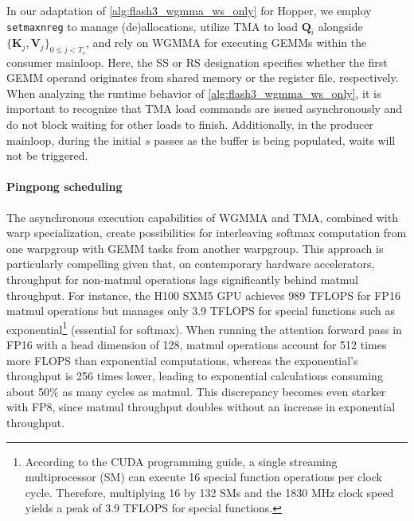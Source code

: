 In our adaptation of \cref{alg:flash3_wgmma_ws_only} for Hopper, we employ \verb|setmaxnreg| to manage (de)allocations, utilize TMA to load $\mathbf{Q}_i$ alongside $\{ \mathbf{K}_j, \mathbf{V}_j \}_{0 \leq j < T_c}$, and rely on WGMMA for executing GEMMs within the consumer mainloop. Here, the SS or RS designation specifies whether the first GEMM operand originates from shared memory or the register file, respectively. When analyzing the runtime behavior of \cref{alg:flash3_wgmma_ws_only}, it is important to recognize that TMA load commands are issued asynchronously and do not block waiting for other loads to finish. Additionally, in the producer mainloop, during the initial $s$ passes as the buffer is being populated, waits will not be triggered.

\paragraph{Pingpong scheduling} The asynchronous execution capabilities of WGMMA and TMA, combined with warp specialization, create possibilities for interleaving softmax computation from one warpgroup with GEMM tasks from another warpgroup. This approach is particularly compelling given that, on contemporary hardware accelerators, throughput for non-matmul operations lags significantly behind matmul throughput. For instance, the H100 SXM5 GPU achieves 989 TFLOPS for FP16 matmul operations but manages only 3.9 TFLOPS for special functions such as exponential\footnote{According to the CUDA programming guide, a single streaming multiprocessor (SM) can execute 16 special function operations per clock cycle. Therefore, multiplying 16 by 132 SMs and the 1830 MHz clock speed yields a peak of 3.9 TFLOPS for special functions.} (essential for softmax). When running the attention forward pass in FP16 with a head dimension of 128, matmul operations account for 512 times more FLOPS than exponential computations, whereas the exponential’s throughput is 256 times lower, leading to exponential calculations consuming about 50\% as many cycles as matmul. This discrepancy becomes even starker with FP8, since matmul throughput doubles without an increase in exponential throughput.

